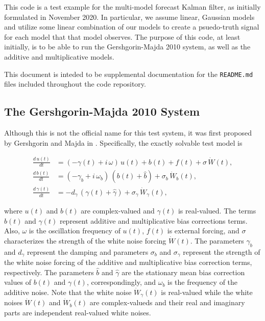 This code is a test example for the multi-model forecast Kalman filter, as initially formulated in November 2020. In particular, we assume linear, Gaussian models and utilize some linear combination of our models to create a psuedo-truth signal for each model that that model observes. The purpose of this code, at least initially, is to be able to run the Gershgorin-Majda 2010 system, as well as the additive and multiplicative models.

This document is inteded to be supplemental documentation for the \texttt{README.md} files included throughout the code repository.

\subsection{The Gershgorin-Majda 2010 System}

Although this is not the official name for this test system, it was first proposed by Gershgorin and Majda in \cite{Gershgorin10}. Specifically, the exactly solvable test model is

\begin{align}
	\frac{d\,u\left( t \right)}{dt} &= \left( -\gamma\left( t \right) + i\,\omega \right)\,u\left( t \right) + b\left( t \right) + f\left( t \right) + \sigma\,\dot{W}\left( t \right), \\
	\frac{d\,b\left( t \right)}{dt} &= \left( -\gamma_{b} + i\,\omega_{b} \right)\,\left( b\left( t \right) + \widehat{b} \right) + \sigma_{b}\,\dot{W}_{b}\left( t \right),\\
	\frac{d\,\gamma\left( t \right)}{dt} &= -d_{\gamma}\,\left( \gamma\left( t \right) + \widehat{\gamma} \right) + \sigma_{\gamma}\,\dot{W}_{\gamma}\left( t \right),
\end{align}

where $u\left( t \right)$ and $b\left( t \right)$ are complex-valued and $\gamma\left( t \right)$ is real-valued. The terms $b\left( t \right)$ and $\gamma\left( t \right)$ represent additive and multiplicative bias corrections terms. Also, $\omega$ is the oscillation frequency of $u\left( t \right)$, $f\left( t \right)$ is external forcing, and $\sigma$ characterizes the strength of the white noise forcing $\dot{W}\left( t \right)$. The parameters $\gamma_{b}$ and $d_{\gamma}$ represent the damping and parameters $\sigma_{b}$ and $\sigma_{\gamma}$ represent the strength of the white noise forcing of the additive and multiplicative bias correction terms, respectively. The parameters $\widehat{b}$ and $\widehat{\gamma}$ are the stationary mean bias correction values of $b\left( t \right)$ and $\gamma\left( t \right)$, correspondingly, and $\omega_{b}$ is the frequency of the additive noise. Note that the white noise $\dot{W}_{\gamma}\left( t \right)$ is real-valued while the white noises $\dot{W}\left( t \right)$ and $\dot{W}_{b}\left( t \right)$ are complex-valueds and their real and imaginary parts are independent real-valued white noises.


